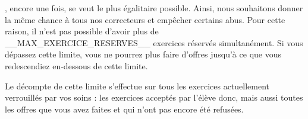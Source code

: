 ﻿\eDevoir, encore une fois, se veut le plus égalitaire possible. Ainsi, nous souhaitons donner la même chance à tous nos correcteurs et empêcher certains abus. Pour cette raison, il n'est pas possible d'avoir plus de __MAX_EXERCICE_RESERVES__ exercices réservés simultanément. Si vous dépassez cette limite, vous ne pourrez plus faire d'offres jusqu'à ce que vous redescendiez en-dessous de cette limite.

Le décompte de cette limite s'effectue sur tous les exercices actuellement verrouillés par vos soins : les exercices acceptés par l'élève donc, mais aussi toutes les offres que vous avez faites et qui n'ont pas encore été refusées.